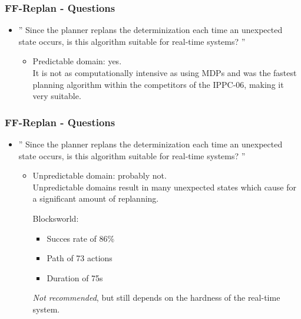 \documentclass{beamer}
\let\origframetitle=\frametitle
\renewcommand\frametitle[1]{\origframetitle{\textbf{\large{\textrm{#1}}}}}
\begin{document}
\begin{frame}
  \frametitle{FF-Replan - Questions}
  \begin{itemize}
	\item '' Since the planner replans the determinization each time an unexpected state occurs, is this algorithm suitable for real-time systems? ''

	\begin{itemize}
		\item Predictable domain: yes. \\
It is not as computationally intensive as using MDPs  and was the fastest planning algorithm within the competitors of the IPPC-06, making it very suitable.

	\end{itemize}

   \end{itemize}
\end{frame}

\begin{frame}
  \frametitle{FF-Replan - Questions}
  \begin{itemize}
	\item '' Since the planner replans the determinization each time an unexpected state occurs, is this algorithm suitable for real-time systems? ''

	\begin{itemize}
		\item Unpredictable domain: probably not. \\
Unpredictable domains result in many unexpected states which cause for a significant amount of replanning. 

Blocksworld:
\begin{itemize}
	\item Succes rate of 86\%
	\item Path of 73 actions
	\item Duration of 75s
\end{itemize}

\emph{Not recommended}, but still depends on the hardness of the real-time system. 

	\end{itemize}

   \end{itemize}
\end{frame}
\end{document}
